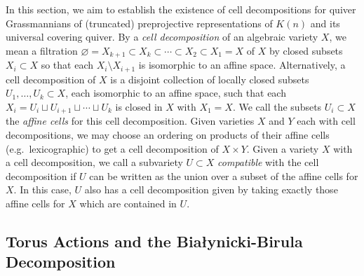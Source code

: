 \documentclass[smallextended,envcountsect,envcountsame]{svjour3}
\numberwithin{equation}{section}
\begin{document}
\noindent 
In this section, we aim to establish the existence of cell decompositions for quiver Grassmannians of (truncated) preprojective representations of $K(n)$ and its universal covering quiver.
By a \emph{cell decomposition} of an algebraic variety $X$, we mean a filtration $\varnothing=X_{k+1}\subset X_k\subset \cdots \subset X_2\subset X_1=X$ of $X$ by closed subsets $X_i\subset X$ so that each $X_i\setminus X_{i+1}$ is isomorphic to an affine space.
Alternatively, a cell decomposition of $X$ is a disjoint collection of locally closed subsets $U_1,\ldots,U_k\subset X$, each isomorphic to an affine space, such that each $X_i=U_i\sqcup U_{i+1}\sqcup\cdots\sqcup U_k$ is closed in $X$ with $X_1=X$.
We call the subsets $U_i\subset X$ the \emph{affine cells} for this cell decomposition.
Given varieties $X$ and $Y$ each with cell decompositions, we may choose an ordering on products of their affine cells (e.g.\ lexicographic) to get a cell decomposition of $X\times Y$. 
Given a variety $X$ with a cell decomposition, we call a subvariety $U\subset X$ \emph{compatible} with the cell decomposition if $U$ can be written as the union over a subset of the affine cells for $X$.
In this case, $U$ also has a cell decomposition given by taking exactly those affine cells for $X$ which are contained in $U$.


\subsection{Torus Actions and the Bia\l{}ynicki-Birula Decomposition}
\label{sec:bb}
\end{document}
